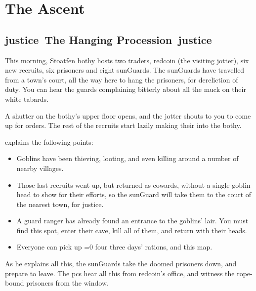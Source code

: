 \section{The Ascent}

\begin{multicols}{2}

\subsection[The Hanging Procession]{\gls{justice}~The Hanging Procession~\gls{justice}}

\begin{boxtext}
  This morning, Stoatfen \gls{bothy} hosts two traders, \gls{redcoin} (the visiting \gls{jotter}), six new recruits, six prisoners and eight \glspl{sunGuard}.
  The \glspl{sunGuard} have travelled from a town's \gls{court}, all the way here to hang the prisoners, for dereliction of duty.
  You can hear the guards complaining bitterly about all the muck on their white tabards.

  A shutter on the \gls{bothy}'s upper floor opens, and the \gls{jotter} shouts to you to come up for orders.
  The rest of the recruits start lazily making their into the \gls{bothy}.
\end{boxtext}

 explains the following points:

\begin{itemize}
  \it
  \item
  Goblins have been thieving, looting, and even killing around a number of nearby \glspl{village}.
  \item
  Those last recruits went up, but returned as cowards, without a single goblin head to show for their efforts, so the \gls{sunGuard} will take them to the \gls{court} of the nearest town, for justice.
  \item
  A \gls{guard} ranger has already found an entrance to the goblins' lair.
  You must find this spot, enter their cave, kill all of them, and return with their heads.
  \item
  Everyone can pick up \ifnum\value{temperature}=0 four \else three \fi days' rations, and this map.
\end{itemize}

\noindent
As he explains all this, the \glspl{sunGuard} take the doomed prisoners down, and prepare to leave.
The \glspl{pc} hear all this from \gls{redcoin}'s office, and witness the rope-bound prisoners from the window.


\end{multicols}
